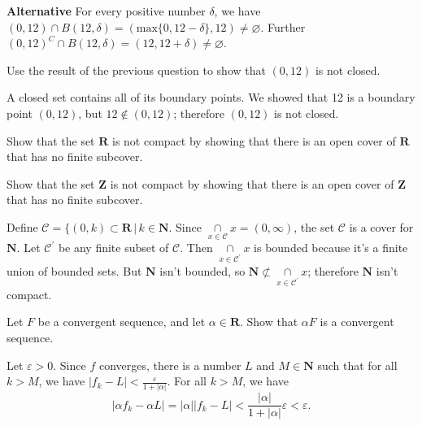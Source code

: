 \documentclass[12pt, fleqn, answers]{exam}
\newcommand{\reals}{\mathbf{R}}
\begin{document}
\begin{questions}
\begin{solution}
\textbf{Alternative} For every positive number \(\delta\), we have
\( (0,12) \cap B(12, \delta)  = (\mbox{max} \{0, 12 - \delta \}, 12) \neq \varnothing\). 
Further \( (0,12)^C \cap B(12, \delta)  = (12, 12 + \delta) \neq \varnothing\). 

\end{solution}

\question  Use the result of the previous question to show that \((0,12)\) is not
closed.

\begin{solution}%
A closed set contains all of its boundary points. We showed that 12 is a boundary point \((0,12)\), but
\(12 \notin (0,12)\); therefore \((0,12)\) is not closed.
\end{solution}


\question  Show that the set \(\reals\) is not compact by 
showing that there is an open cover of \( \reals \) that has no
finite subcover.


\question  Show that the set \(\mathbf{Z}\) is not compact by 
showing that there is an open cover of \( \mathbf{Z} \) that has no
finite subcover.

\begin{solution}%
  Define \(\mathcal{C} = \{(0,k) \subset \reals \, | \, k \in \mathbf{N}\). Since 
  \(\underset{x \in \mathcal{C}}{\cap} x = (0,\infty)\), the set \(\mathcal{C}\)
is a cover for  \(\mathbf{N}\). Let  \(\mathcal{C}^\prime\) be any finite subset
of  \(\mathcal{C}\). Then \(\underset{x \in \mathcal{C}^\prime}{\cap} x\) is
bounded because it's a finite union of bounded sets.  But \(\mathbf{N}\) isn't
bounded, so \(\mathbf{N} \not \subset \underset{x \in \mathcal{C}^\prime}{\cap} x\);
therefore \(\mathbf{N}\) isn't compact.
\end{solution}


\question Let \(F\) be a convergent sequence, and let \(\alpha \in
\reals\).  Show that \(\alpha F\) is a convergent sequence.



\begin{solution}%
Let \(\varepsilon > 0\). Since \(f\) converges, there is a number \(L\) and 
\(M \in \mathbf{N}\) such that for all \(k > M\), we have \(|f_k - L| < \frac{\varepsilon}{1 + |\alpha|}\).
For all \(k > M\), we have
\[
  |\alpha f_k - \alpha L| = |\alpha| |f_k - L|
                          < \frac{ |\alpha|}{1 + |\alpha|} \varepsilon
                          < \varepsilon.
\]


\end{solution}
\end{questions}
\end{document}
